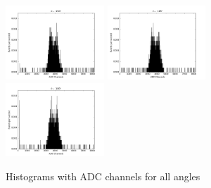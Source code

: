 \documentclass[a4paper,parskip,11pt, DIV12]{scrreprt}
\begin{document}
\begin{figure}[H]
\includegraphics[width=0.33\textwidth]{150degraw.png}\hfill
\includegraphics[width=0.33\textwidth]{165degraw.png}\hfill
\includegraphics[width=0.33\textwidth]{180degraw.png}
\caption{Histograms with ADC channels for all angles}
\end{figure}
%
\end{document}
